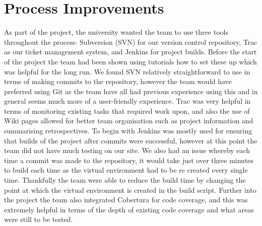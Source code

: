 \documentclass{l3proj}
\begin{document}
\section{Process Improvements}
\label{sec:process-improvements}


As part of the project, the university wanted the team to use three tools throughout the process: Subversion (SVN) for our version control
repository, Trac as our ticket management system, and Jenkins for project builds. Before the start of the project the team had been
shown using tutorials how to set these up which was helpful for the long run. We found SVN relatively straightforward to use
in terms of making commits to the repository, however the team would have preferred using Git as the team have all
had previous experience using this and in general seems much more of a user-friendly experience. Trac was very helpful in
terms of monitoring existing tasks that required work upon, and also the use of Wiki pages allowed for better team organisation
such as project information and summarising retrospectives. To begin with Jenkins was mostly used for ensuring that builds of
the project after commits were successful, however at this point the team did not have much testing on our site. We also had an issue
whereby each time a commit was made to the repository, it would take just over three minutes to build each time as the virtual
environment had to be re created every single time. Thankfully the team were able to reduce the build time by changing the point at
which the virtual environment is created in the build script. Further into the project the team also integrated Cobertura for code
coverage, and this was extremely helpful in terms of the depth of existing code coverage and what areas were still to be tested.
\end{document}
